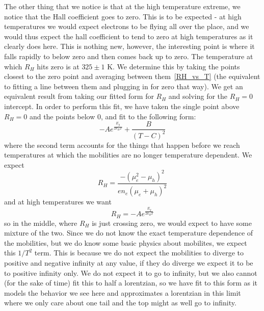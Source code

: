 \documentclass[reprint, nobibnotes, amssymb, amsmath, amsfonts, physics, mathtools, mathrsfs, floatfix]{revtex4-1}
\begin{document}
    The other thing that we notice is that at the high temperature extreme, we notice that the Hall coefficient goes to zero.  This is to be expected - at high temperatures we would expect electrons to be flying all over the place, and we would thus expect the hall coefficient to tend to zero at high temperatures as it clearly does here.  This is nothing new, however, the interesting point is where it falls rapidly to below zero and then comes back up to zero.  The temperature at which $R_H$ hits zero is at $325\pm1$ K.  We determine this by taking the points closest to the zero point and averaging between them~\ref{RH_vs_T} (the equivalent to fitting a line between them and plugging in for zero that way).  We get an equivalent result from taking our fitted form for $R_H$ and solving for the $R_H = 0$ intercept.  In order to perform this fit, we have taken the single point above $R_H = 0$ and the points below 0, and fit to the following form:
    \begin{equation}
      -Ae^{\frac{E_g}{2 k_B T}} + \frac{B}{(T-C)^2}
    \end{equation}
    where the second term accounts for the things that happen before we reach temperatures at which the mobilities are no longer temperature dependent.  We expect
    \begin{equation}
      R_H = \frac{-(\mu_e^2 - \mu_h)^2}{en_e(\mu_e + \mu_h)^2}
    \end{equation}
    and at high temperatures we want
    \begin{equation}
      R_H = -Ae^{\frac{E_g}{2 k_B T}}
    \end{equation}
    so in the middle, where $R_H$ is just crossing zero, we would expect to have some mixture of the two.  Since we do not know the exact temperature dependence of the mobilities, but we do know some basic physics about mobilites, we expect this $1/T^2$ term.  This is because we do not expect the mobilities to diverge to positive and negative infinity at any value, if they do diverge we expect it to be to positive infinity only.  We do not expect it to go to infinity, but we also cannot (for the sake of time) fit this to half a lorentzian, so we have fit to this form as it models the behavior we see here and approximates a lorentzian in this limit where we only care about one tail and the top might as well go to infinity.
\end{document}

